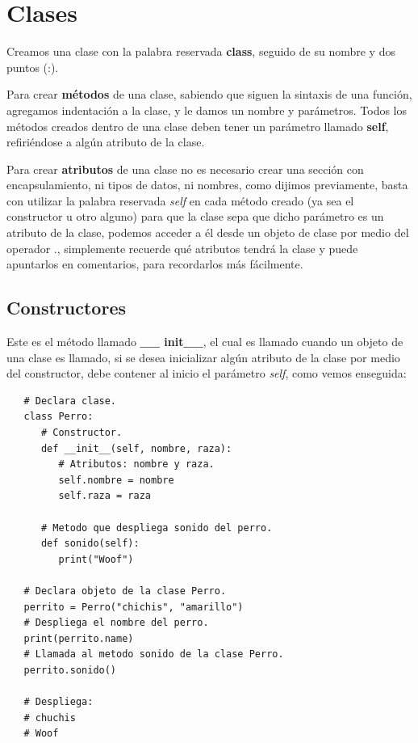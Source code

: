 \section{Clases}
\hspace{0.55cm}Creamos una clase con la palabra reservada \textbf{class}, seguido de su nombre y dos puntos (:).

Para crear \textbf{métodos} de una clase, sabiendo que siguen la sintaxis de una función,  agregamos indentación a la clase, y le damos un nombre y parámetros. Todos los métodos creados dentro de una clase deben tener un parámetro llamado \textbf{self}, refiriéndose a algún atributo de la clase.

Para crear \textbf{atributos} de una clase no es necesario crear una sección con encapsulamiento, ni tipos de datos, ni nombres, como dijimos previamente, basta con utilizar la palabra reservada \textit{self} en cada método creado (ya sea el constructor u otro alguno) para que la clase sepa que dicho parámetro es un atributo de la clase, podemos acceder a él desde un objeto de clase por medio del operador ., simplemente recuerde qué atributos tendrá la clase y puede apuntarlos en comentarios, para recordarlos más fácilmente.


\subsection{Constructores}
\hspace{0.55cm}Este es el método llamado \textbf{\_\_ init\_\_}, el cual es llamado cuando un objeto de una clase es llamado, si se desea inicializar algún atributo de la clase por medio del constructor, debe contener al inicio el parámetro \textit{self}, como vemos enseguida:
\begin{lstlisting}
   # Declara clase.
   class Perro:
      # Constructor.
      def __init__(self, nombre, raza):
         # Atributos: nombre y raza.
         self.nombre = nombre
         self.raza = raza
      
      # Metodo que despliega sonido del perro.
      def sonido(self):
         print("Woof")
      
   # Declara objeto de la clase Perro.
   perrito = Perro("chichis", "amarillo")
   # Despliega el nombre del perro.
   print(perrito.name)
   # Llamada al metodo sonido de la clase Perro.
   perrito.sonido()
      
   # Despliega:
   # chuchis
   # Woof
\end{lstlisting}


